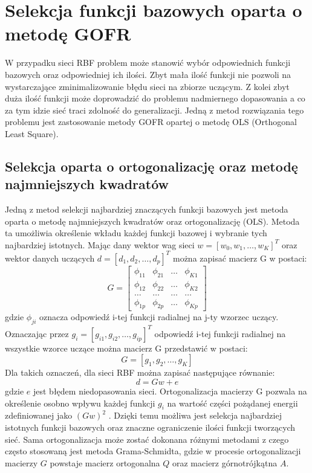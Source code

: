 \newpage
\section{Selekcja funkcji bazowych oparta o metodę GOFR}
W przypadku sieci RBF problem może stanowić wybór odpowiednich funkcji bazowych oraz odpowiedniej ich ilości. Zbyt mała ilość funkcji nie pozwoli na wystarczające zminimalizowanie błędu sieci na zbiorze uczącym. Z kolei zbyt duża ilość funkcji może doprowadzić do problemu nadmiernego dopasowania a co za tym idzie sieć traci zdolność do generalizacji. Jedną z metod rozwiązania tego problemu jest zastosowanie metody GOFR opartej o metodę OLS (Orthogonal Least Square). 

\subsection{Selekcja oparta o ortogonalizację oraz metodę najmniejszych kwadratów}
Jedną z metod selekcji najbardziej znaczących funkcji bazowych jest metoda oparta o metodę najmniejszych kwadratów oraz ortogonalizację (OLS)\cite{Chen}. Metoda ta umożliwia określenie wkładu każdej funkcji bazowej i wybranie tych najbardziej istotnych. Mając dany wektor wag sieci $w = [w_0, w_1, \hdots, w_K]^T$ oraz wektor danych uczących $d = [d_1, d_2, \hdots, d_p]^T$ można zapisać macierz G w postaci:
\begin{equation}
G = \begin{bmatrix}
\phi_{11} & \phi_{21} & \hdots & \phi_{K1} \\
\phi_{12} & \phi_{22} & \hdots & \phi_{K2} \\
\hdots    & \hdots    & \hdots & \hdots    \\
\phi_{1p} & \phi_{2p} & \hdots & \phi_{Kp}
\end{bmatrix}
\end{equation}
gdzie $\phi_{ji}$ oznacza odpowiedź i-tej funkcji radialnej na j-ty wzorzec uczący. Oznaczając przez $g_i = [g_{i1}, g_{i2}, \hdots, g_{ip}]^T$ odpowiedź i-tej funkcji radialnej na wszystkie wzorce uczące można macierz G przedstawić w postaci:
\begin{equation}G = [g_1, g_2, \hdots, g_K] \end{equation}
Dla takich oznaczeń, dla sieci RBF można zapisać następujące równanie:
\begin{equation}
\label{wzor:ofr_rbf}
d = Gw + e\end
{equation}
gdzie $e$ jest błędem niedopasowania sieci. Ortogonalizacja macierzy G pozwala na określenie osobno wpływu każdej funkcji $g_i$ na wartość części pożądanej energii zdefiniowanej jako $(Gw)^2$ \cite{Osowski}. Dzięki temu możliwa jest selekcja najbardziej istotnych funkcji bazowych oraz znaczne ograniczenie ilości funkcji tworzących sieć. Sama ortogonalizacja może zostać dokonana różnymi metodami z czego często stosowaną jest metoda Grama-Schmidta, gdzie w procesie ortogonalizacji macierzy $G$ powstaje macierz ortogonalna $Q$ oraz macierz górnotrójkątna $A$.
